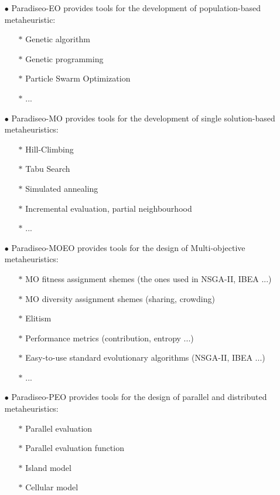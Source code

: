 \documentclass[a4paper]{article}
\begin{document}
    \begin{center}
    \end{center}

    \begin{itemize}
        \item[$\bullet$] Paradiseo-EO provides tools for the development of population-based metaheuristic:
        \begin{itemize}
               \item[$\ast$] Genetic algorithm
               \item[$\ast$] Genetic programming
               \item[$\ast$] Particle Swarm Optimization
               \item[$\ast$] ...
        \end{itemize}
        \item[$\bullet$] Paradiseo-MO provides tools for the development of single solution-based metaheuristics:
        \begin{itemize}
           \item[$\ast$] Hill-Climbing
                   \item[$\ast$] Tabu Search
                   \item[$\ast$] Simulated annealing
                   \item[$\ast$] Incremental evaluation, partial neighbourhood
                   \item[$\ast$] ...
        \end{itemize}
        \item[$\bullet$] Paradiseo-MOEO provides tools for the design of Multi-objective metaheuristics:
        \begin{itemize}
           \item[$\ast$] MO fitness assignment shemes (the ones used in NSGA-II, IBEA ...)
                   \item[$\ast$] MO diversity assignment shemes (sharing, crowding)
                   \item[$\ast$] Elitism
                   \item[$\ast$] Performance metrics (contribution, entropy ...)
                   \item[$\ast$] Easy-to-use standard evolutionary algorithms (NSGA-II, IBEA ...)
                   \item[$\ast$] ...
        \end{itemize}
       \item[$\bullet$] Paradiseo-PEO provides tools for the design of parallel and distributed metaheuristics:
        \begin{itemize}
               \item[$\ast$] Parallel evaluation
                   \item[$\ast$] Parallel evaluation function
                   \item[$\ast$] Island model
                   \item[$\ast$] Cellular model
        \end{itemize}
    \end{itemize}
\end{document}
